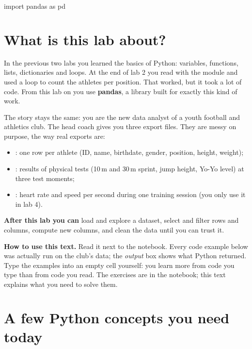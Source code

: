 \documentclass[11pt,a4paper]{article}
\author{dr. Maarten Slembrouck}
\begin{document}

\begin{python}[hide]
import pandas as pd
\end{python}

\section*{What is this lab about?}

In the previous two labs you learned the basics of Python: variables,
functions, lists, dictionaries and loops. At the end of lab 2 you read
 with the  module and used a 
loop to count the athletes per position. That worked, but it took a lot
of code. From this lab on you use \textbf{pandas}, a library built for
exactly this kind of work.

The story stays the same: you are the new data analyst of a youth
football and athletics club. The head coach gives you three export
files. They are messy on purpose, the way real exports are:

\begin{itemize}
  \item {}: one row per athlete (ID, name, birthdate,
        gender, position, height, weight);
  \item {}: results of physical tests (10\,m and 30\,m
        sprint, jump height, Yo-Yo level) at three test moments;
  \item {}: heart rate and speed per second during
        one training session (you only use it in lab 4).
\end{itemize}

\textbf{After this lab you can} load and explore a dataset, select and
filter rows and columns, compute new columns, and clean the data until
you can trust it.

\textbf{How to use this text.} Read it next to the notebook. Every code
example below was actually run on the club's data; the \emph{output}
box shows what Python returned. Type the examples into an empty cell
yourself: you learn more from code you type than from code you read.
The exercises are in the notebook; this text explains what you need to
solve them.

\section{A few Python concepts you need today}
\end{document}
